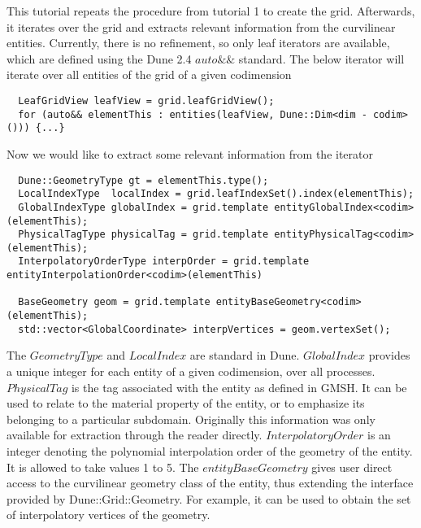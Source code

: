 This tutorial repeats the procedure from tutorial 1 to create the grid. Afterwards, it iterates over the grid and extracts relevant information from the curvilinear entities. Currently, there is no refinement, so only leaf iterators are available, which are defined using the Dune 2.4 $auto \&\&$ standard. The below iterator will iterate over all entities of the grid of a given codimension \\

\begin{mybox}
\begin{lstlisting}
  LeafGridView leafView = grid.leafGridView();
  for (auto&& elementThis : entities(leafView, Dune::Dim<dim - codim>())) {...}
\end{lstlisting}
\end{mybox}


Now we would like to extract some relevant information from the iterator \\
\begin{mybox}
\begin{lstlisting}
  Dune::GeometryType gt = elementThis.type();
  LocalIndexType  localIndex = grid.leafIndexSet().index(elementThis);
  GlobalIndexType globalIndex = grid.template entityGlobalIndex<codim>(elementThis);
  PhysicalTagType physicalTag = grid.template entityPhysicalTag<codim>(elementThis);
  InterpolatoryOrderType interpOrder = grid.template entityInterpolationOrder<codim>(elementThis)
	
  BaseGeometry geom = grid.template entityBaseGeometry<codim>(elementThis);
  std::vector<GlobalCoordinate> interpVertices = geom.vertexSet();
\end{lstlisting}
\end{mybox}

\noindent
The $GeometryType$ and $LocalIndex$ are standard in Dune. $GlobalIndex$ provides a unique integer for each entity of a given codimension, over all processes. $PhysicalTag$ is the tag associated with the entity as defined in GMSH. It can be used to relate to the material property of the entity, or to emphasize its belonging to a particular subdomain. Originally this information was only available for extraction through the reader directly. $InterpolatoryOrder$ is an integer denoting the polynomial interpolation order of the geometry of the entity. It is allowed to take values 1 to 5. The $entityBaseGeometry$ gives user direct access to the curvilinear geometry class of the entity, thus extending the interface provided by Dune::Grid::Geometry. For example, it can be used to obtain the set of interpolatory vertices of the geometry. \\






